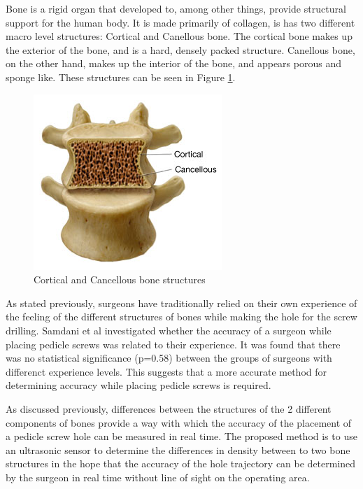 \documentclass[conference, a4paper]{IEEEtran}
\begin{document}
Bone is a rigid organ that developed to, among other things, 
provide structural support for the human body. It is made primarily of
collagen, is has two different macro level structures: Cortical and Canellous 
bone. The cortical bone makes up the exterior of the bone, and is a hard, 
densely packed structure. Canellous bone, on the other hand, makes up the
interior of the bone, and appears porous and sponge like. These structures
can be seen in Figure \ref{fig:boneStruct}.

\begin{figure}
	\centering
	\includegraphics{assets/boneStruct.jpg}
	\caption{Cortical and Cancellous bone structures \cite{boneStructure}}
	\label{fig:boneStruct}
\end{figure}

As stated previously, surgeons have traditionally relied on their own
experience of the feeling of the different structures of bones while
making the hole for the screw drilling. Samdani et al \cite{Samdani2010}
investigated whether the accuracy of a surgeon while placing pedicle screws
was related to their experience. It was found that there was no statistical
significance (p=0.58) between the groups of surgeons with differenct 
experience levels. This suggests that a more accurate method for determining
accuracy while placing pedicle screws is required.

As discussed previously,
differences between the structures of the 2 different components of bones
provide a way with which the accuracy of the placement of a pedicle screw hole
can be measured in real time. The proposed method is to use an ultrasonic 
sensor to determine the differences in density between to two bone structures
in the hope that the accuracy of the hole trajectory can be determined by the
surgeon in real time without line of sight on the operating area. 







%
%




\end{document}
